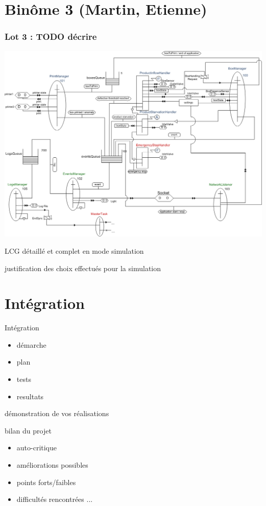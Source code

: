 \documentclass{beamer}
\begin{document}
\section{Binôme 3 (Martin, Etienne)}
	\begin{frame}
	    \begin{center}
		    \frametitle{Lot 3 : TODO décrire}
		    \includegraphics[height=0.8\textheight]{../../SchemasLCG/schemaGlobal.png}
	    \end{center}
	\end{frame}

	\begin{frame}
		LCG détaillé et complet en mode simulation
	\end{frame}

	\begin{frame}
		justification des choix effectués pour la simulation 
	\end{frame}

\section{Intégration}
	\begin{frame}
		Intégration
		\begin{itemize}
			\item démarche
			\item plan
			\item tests
			\item resultats
		\end{itemize}
	\end{frame}

	\begin{frame}
		démonstration de vos réalisations
	\end{frame}

	\begin{frame}
		bilan du projet
		\begin{itemize}
			\item auto-critique
			\item améliorations possibles
			\item points forts/faibles
			\item difficultés rencontrées ...
		\end{itemize}
	\end{frame}
\end{document}
